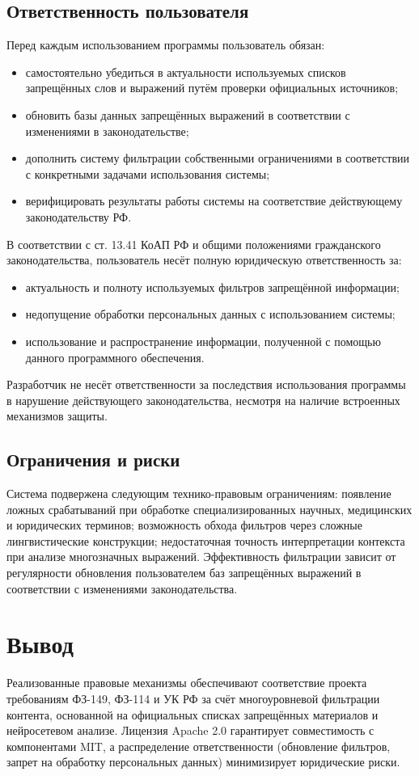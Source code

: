 \subsection{Ответственность пользователя}
Перед каждым использованием программы пользователь обязан:
\begin{itemize}
	\item самостоятельно убедиться в актуальности используемых списков запрещённых слов и выражений путём проверки официальных источников;
	\item обновить базы данных запрещённых выражений в соответствии с изменениями в законодательстве;
	\item дополнить систему фильтрации собственными ограничениями в соответствии с конкретными задачами использования системы;
	\item верифицировать результаты работы системы на соответствие действующему законодательству РФ.
\end{itemize}

\newpage
В соответствии с ст. 13.41 КоАП РФ и общими положениями гражданского законодательства, пользователь несёт полную юридическую ответственность за:
\begin{itemize}
	\item актуальность и полноту используемых фильтров запрещённой информации;
	\item недопущение обработки персональных данных с использованием системы;
	\item использование и распространение информации, полученной с помощью данного программного обеспечения.
\end{itemize}

Разработчик не несёт ответственности за последствия использования программы в нарушение действующего законодательства, несмотря на наличие встроенных механизмов защиты.

\subsection{Ограничения и риски}
Система подвержена следующим технико-правовым ограничениям: появление ложных срабатываний при обработке специализированных научных, медицинских и юридических терминов; возможность обхода фильтров через сложные лингвистические конструкции; недостаточная точность интерпретации контекста при анализе многозначных выражений. Эффективность фильтрации зависит от регулярности обновления пользователем баз запрещённых выражений в соответствии с изменениями законодательства.

\section{Вывод}
Реализованные правовые механизмы обеспечивают соответствие проекта требованиям ФЗ-149, ФЗ-114 и УК РФ за счёт многоуровневой фильтрации контента, основанной на официальных списках запрещённых материалов и нейросетевом анализе. Лицензия Apache 2.0 гарантирует совместимость с компонентами MIT, а распределение ответственности (обновление фильтров, запрет на обработку персональных данных) минимизирует юридические риски.